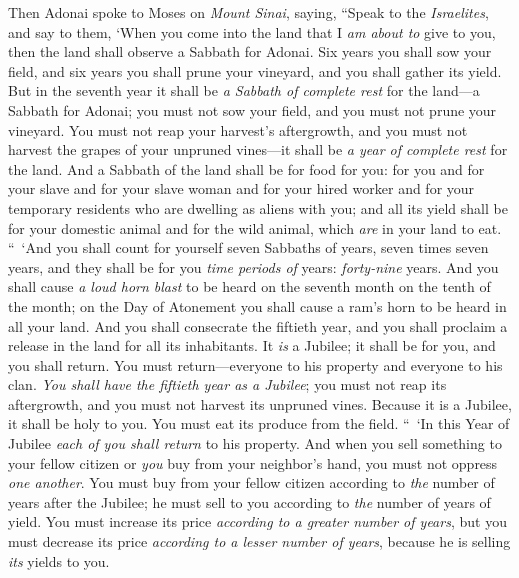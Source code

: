 \begin{biblechapter} %
 Then Adonai spoke to Moses on \textit{Mount Sinai}, saying,
\verse “Speak to the \textit{Israelites}, and say to them, ‘When you come into the land that I \textit{am about to} give to you, then the land shall observe a Sabbath for Adonai.
\verse Six years you shall sow your field, and six years you shall prune your vineyard, and you shall gather its yield.
\verse But in the seventh year it shall be \textit{a Sabbath of complete rest} for the land—a Sabbath for Adonai; you must not sow your field, and you must not prune your vineyard.
\verse You must not reap your harvest’s aftergrowth, and you must not harvest the grapes of your unpruned vines—it shall be \textit{a year of complete rest} for the land.
\verse And a Sabbath of the land shall be for food for you: for you and for your slave and for your slave woman and for your hired worker and for your temporary residents who are dwelling as aliens with you;
\verse and all its yield shall be for your domestic animal and for the wild animal, which \textit{are} in your land to eat.
 “ ‘And you shall count for yourself seven Sabbaths of years, seven times seven years, and they shall be for you \textit{time periods of} years: \textit{forty-nine} years.
\verse And you shall cause \textit{a loud horn blast} to be heard on the seventh month on the tenth of the month; on the Day of Atonement you shall cause a ram’s horn to be heard in all your land.
\verse And you shall consecrate the fiftieth year, and you shall proclaim a release in the land for all its inhabitants. It \textit{is} a Jubilee; it shall be for you, and you shall return. You must return—everyone to his property and everyone to his clan.
\verse \textit{You shall have the fiftieth year as a Jubilee}; you must not reap its aftergrowth, and you must not harvest its unpruned vines.
\verse Because it is a Jubilee, it shall be holy to you. You must eat its produce from the field.
\verse “ ‘In this Year of Jubilee \textit{each of you shall return} to his property.
\verse And when you sell something to your fellow citizen or \textit{you} buy from your neighbor’s hand, you must not oppress \textit{one another}.
\verse You must buy from your fellow citizen according to \textit{the} number of years after the Jubilee; he must sell to you according to \textit{the} number of years of yield.
\verse You must increase its price \textit{according to a greater number of years}, but you must decrease its price \textit{according to a lesser number of years}, because he is selling \textit{its} yields to you.

\end{biblechapter}
